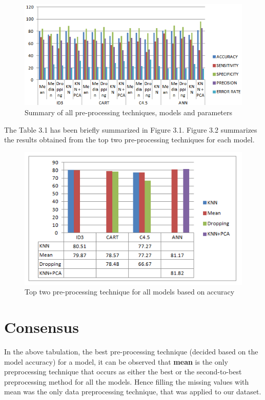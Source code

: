 \clearpage
\begin{figure}[h]
\centering %
\includegraphics[scale=1.15]{sumprp4.PNG}
\caption{\label{fig:subBDDs1}Summary of all pre-processing techniques, models and parameters}
\end{figure}
\par \noindent The Table 3.1 has been briefly summarized in Figure 3.1.
Figure 3.2 summarizes the results obtained from the top two pre-processing techniques for each model.
\begin{figure}[h]
\centering %
\includegraphics[scale=1.15]{topprp.PNG}
\caption{\label{fig:subBDDs1}Top two pre-processing technique for all models
based on accuracy
}
\end{figure}
\pagebreak
\section{Consensus}
In the above tabulation, the best pre-processing technique (decided based on the model accuracy) for a model, it can be observed that \textbf{mean} is the only preprocessing technique that occurs as either the best or the second-to-best preprocessing method for all the models. Hence filling the missing values with mean was the only data preprocessing technique, that was applied to our dataset.